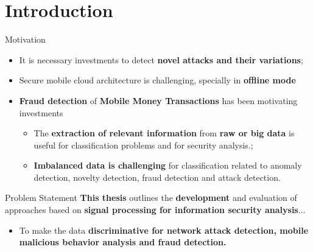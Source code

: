 \documentclass[newPxFont, numfooter, sectionpages]{beamer}
\begin{document}
\section{Introduction}
\begin{frame}[c]{Motivation}
	\begin{itemize}
		\item It is necessary investments to detect \textbf{novel attacks and their variations};
		\item Secure mobile cloud architecture is challenging, specially in \textbf{offline mode}
		\item \textbf{Fraud detection} of \textbf{Mobile Money Transactions} has been motivating investments
		\begin{itemize}
			\item The \textbf{extraction of relevant information} from \textbf{raw or big data} is useful for classification problems and for security analysis.;
			\item \textbf{Imbalanced data is challenging} for classification related to anomaly detection, novelty detection, fraud detection and attack detection.
		\end{itemize}
	\end{itemize}
\end{frame}
\begin{frame}[c]{Problem Statement}
	\textbf{This thesis} outlines the \textbf{development} and evaluation of approaches based on \textbf{signal processing for information security analysis}...
	\begin{itemize}
		\item To make the data \textbf{discriminative for network attack detection, mobile malicious behavior analysis and fraud detection.}
	\end{itemize}
\end{frame}
\end{document}
